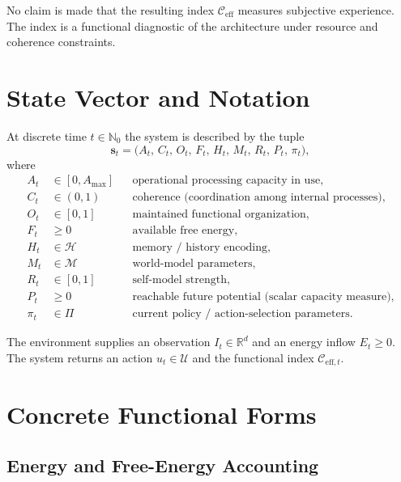 \documentclass[11pt,a4paper]{article}
\begin{document}
No claim is made that the resulting index \(\mathcal{C}_{\mathrm{eff}}\) measures subjective experience. The index is a functional diagnostic of the architecture under resource and coherence constraints.

\section{State Vector and Notation}

At discrete time \(t \in \mathbb{N}_0\) the system is described by the tuple
\begin{equation}
  \mathbf{s}_t = \bigl( A_t,\, C_t,\, O_t,\, F_t,\, H_t,\, M_t,\, R_t,\, P_t,\, \pi_t \bigr),
\end{equation}
where
\begin{align*}
  A_t &\in [0,A_{\max}] && \text{operational processing capacity in use},\\
  C_t &\in (0,1) && \text{coherence (coordination among internal processes)},\\
  O_t &\in [0,1] && \text{maintained functional organization},\\
  F_t &\ge 0 && \text{available free energy},\\
  H_t &\in \mathcal{H} && \text{memory / history encoding},\\
  M_t &\in \mathcal{M} && \text{world-model parameters},\\
  R_t &\in [0,1] && \text{self-model strength},\\
  P_t &\ge 0 && \text{reachable future potential (scalar capacity measure)},\\
  \pi_t &\in \Pi && \text{current policy / action-selection parameters}.
\end{align*}

The environment supplies an observation \(I_t \in \mathbb{R}^{d}\) and an energy inflow \(E_t \ge 0\). The system returns an action \(u_t \in \mathcal{U}\) and the functional index \(\mathcal{C}_{\mathrm{eff},t}\).

\section{Concrete Functional Forms}

\subsection{Energy and Free-Energy Accounting}
\end{document}
